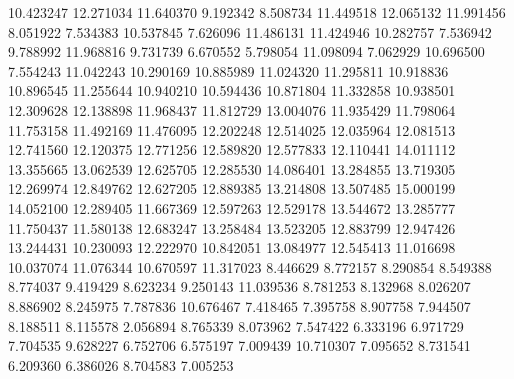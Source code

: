 10.423247
12.271034
11.640370
9.192342
8.508734
11.449518
12.065132
11.991456
8.051922
7.534383
10.537845
7.626096
11.486131
11.424946
10.282757
7.536942
9.788992
11.968816
9.731739
6.670552
5.798054
11.098094
7.062929
10.696500
7.554243
11.042243
10.290169
10.885989
11.024320
11.295811
10.918836
10.896545
11.255644
10.940210
10.594436
10.871804
11.332858
10.938501
12.309628
12.138898
11.968437
11.812729
13.004076
11.935429
11.798064
11.753158
11.492169
11.476095
12.202248
12.514025
12.035964
12.081513
12.741560
12.120375
12.771256
12.589820
12.577833
12.110441
14.011112
13.355665
13.062539
12.625705
12.285530
14.086401
13.284855
13.719305
12.269974
12.849762
12.627205
12.889385
13.214808
13.507485
15.000199
14.052100
12.289405
11.667369
12.597263
12.529178
13.544672
13.285777
11.750437
11.580138
12.683247
13.258484
13.523205
12.883799
12.947426
13.244431
10.230093
12.222970
10.842051
13.084977
12.545413
11.016698
10.037074
11.076344
10.670597
11.317023
8.446629
8.772157
8.290854
8.549388
8.774037
9.419429
8.623234
9.250143
11.039536
8.781253
8.132968
8.026207
8.886902
8.245975
7.787836
10.676467
7.418465
7.395758
8.907758
7.944507
8.188511
8.115578
2.056894
8.765339
8.073962
7.547422
6.333196
6.971729
7.704535
9.628227
6.752706
6.575197
7.009439
10.710307
7.095652
8.731541
6.209360
6.386026
8.704583
7.005253
